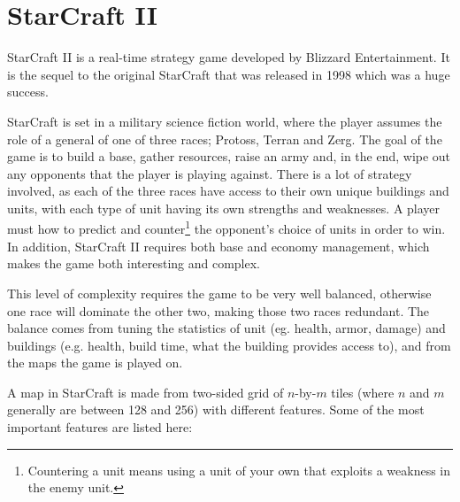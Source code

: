 \section{StarCraft II}
\label{introduction_starcraft}

StarCraft II\cite{starcraft2} is a real-time strategy game developed by Blizzard Entertainment. It is the sequel to the original StarCraft\cite{starcraft} that was released in 1998 which was a huge success.

StarCraft is set in a military science fiction world, where the player assumes the role of a general of one of three races; Protoss, Terran and Zerg. The goal of the game is to build a base, gather resources, raise an army and, in the end, wipe out any opponents that the player is playing against. There is a lot of strategy involved, as each of the three races have access to their own unique buildings and units, with each type of unit having its own strengths and weaknesses. A player must how to predict and counter\footnote{Countering a unit means using a unit of your own that exploits a weakness in the enemy unit.} the opponent's choice of units in order to win. In addition, StarCraft II requires both base and economy management, which makes the game both interesting and complex.


This level of complexity requires the game to be very well balanced, otherwise one race will dominate the other two, making those two races redundant. The balance comes from tuning the statistics of unit (eg. health, armor, damage) and buildings (e.g. health, build time, what the building provides access to), and from the maps the game is played on.

A map in StarCraft is made from two-sided grid of $n$-by-$m$ tiles (where $n$ and $m$ generally are between 128 and 256) with different features. Some of the most important features are listed here:

